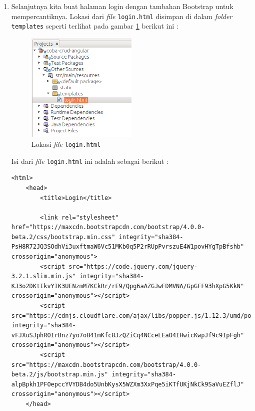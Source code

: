\begin{enumerate}
	\item Selanjutnya kita buat halaman login dengan tambahan Bootstrap untuk mempercantiknya. Lokasi dari \textit{file} \texttt{login.html} disimpan di dalam \textit{folder} \texttt{templates} seperti terlihat pada gambar \ref{fig:lokasi-login} berikut ini :
	
	\begin{figure}[H]
		\centering
		\includegraphics[width=0.5\textwidth]{./resources/022-lokasi-login}
		\caption{Lokasi \textit{file} \texttt{login.html}}
		\label{fig:lokasi-login}
	\end{figure}
	
	Isi dari \textit{file} \texttt{login.html} ini adalah sebagai berikut :
	
	\begin{lstlisting}
<html>
    <head>
        <title>Login</title>

        <link rel="stylesheet" href="https://maxcdn.bootstrapcdn.com/bootstrap/4.0.0-beta.2/css/bootstrap.min.css" integrity="sha384-PsH8R72JQ3SOdhVi3uxftmaW6Vc51MKb0q5P2rRUpPvrszuE4W1povHYgTpBfshb" crossorigin="anonymous">
        <script src="https://code.jquery.com/jquery-3.2.1.slim.min.js" integrity="sha384-KJ3o2DKtIkvYIK3UENzmM7KCkRr/rE9/Qpg6aAZGJwFDMVNA/GpGFF93hXpG5KkN" crossorigin="anonymous"></script>
		<script src="https://cdnjs.cloudflare.com/ajax/libs/popper.js/1.12.3/umd/popper.min.js" integrity="sha384-vFJXuSJphROIrBnz7yo7oB41mKfc8JzQZiCq4NCceLEaO4IHwicKwpJf9c9IpFgh" crossorigin="anonymous"></script>
		<script src="https://maxcdn.bootstrapcdn.com/bootstrap/4.0.0-beta.2/js/bootstrap.min.js" integrity="sha384-alpBpkh1PFOepccYVYDB4do5UnbKysX5WZXm3XxPqe5iKTfUKjNkCk9SaVuEZflJ" crossorigin="anonymous"></script>
    </head>


\end{lstlisting}
\end{enumerate}
